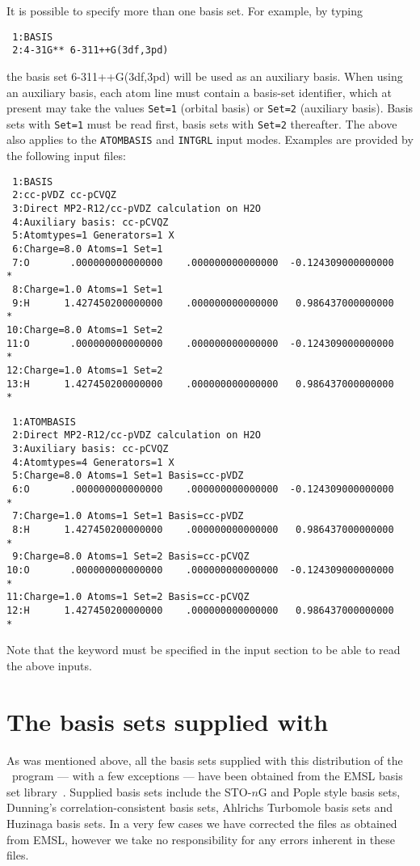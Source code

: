 It is possible to specify more than one basis set. For example, by typing
\begin{verbatim}
 1:BASIS
 2:4-31G** 6-311++G(3df,3pd)
\end{verbatim}
the basis set 6-311++G(3df,3pd) will be used as an auxiliary basis.
When using an auxiliary basis, each atom line must contain a basis-set
identifier, which at present may take the values \verb|Set=1| (orbital basis) or 
\verb|Set=2| (auxiliary basis). Basis sets with \verb|Set=1| must be read first,
basis sets with \verb|Set=2| thereafter.
The above also applies to the \verb|ATOMBASIS| and \verb|INTGRL| input modes.
Examples are provided by the following input files:
\begin{verbatim}
 1:BASIS
 2:cc-pVDZ cc-pCVQZ
 3:Direct MP2-R12/cc-pVDZ calculation on H2O
 4:Auxiliary basis: cc-pCVQZ
 5:Atomtypes=1 Generators=1 X
 6:Charge=8.0 Atoms=1 Set=1
 7:O       .000000000000000    .000000000000000  -0.124309000000000       *
 8:Charge=1.0 Atoms=1 Set=1
 9:H      1.427450200000000    .000000000000000   0.986437000000000       *
10:Charge=8.0 Atoms=1 Set=2
11:O       .000000000000000    .000000000000000  -0.124309000000000       *
12:Charge=1.0 Atoms=1 Set=2
13:H      1.427450200000000    .000000000000000   0.986437000000000       *
\end{verbatim}
\begin{verbatim}
 1:ATOMBASIS
 2:Direct MP2-R12/cc-pVDZ calculation on H2O
 3:Auxiliary basis: cc-pCVQZ
 4:Atomtypes=4 Generators=1 X
 5:Charge=8.0 Atoms=1 Set=1 Basis=cc-pVDZ
 6:O       .000000000000000    .000000000000000  -0.124309000000000       *
 7:Charge=1.0 Atoms=1 Set=1 Basis=cc-pVDZ
 8:H      1.427450200000000    .000000000000000   0.986437000000000       *
 9:Charge=8.0 Atoms=1 Set=2 Basis=cc-pCVQZ
10:O       .000000000000000    .000000000000000  -0.124309000000000       *
11:Charge=1.0 Atoms=1 Set=2 Basis=cc-pCVQZ
12:H      1.427450200000000    .000000000000000   0.986437000000000       *
\end{verbatim}
Note that the keyword  must be specified in the 
 input section to be able to read the above inputs.

\section{The basis sets supplied with \dalton }
\label{sec:basislist}

As was mentioned above, all the basis sets supplied with this distribution
of the \dalton\ program --- with a few exceptions --- have been obtained 
from the EMSL basis set library~\cite{emslref}. 
Supplied basis sets include the STO-$n$G and Pople style basis sets,
Dunning's correlation-consistent basis 
sets, 
Ahlrichs Turbomole basis sets and Huzinaga basis sets. 
In a very few cases we have corrected the
files as obtained from EMSL, however we take no responsibility
for any errors inherent in these files.

